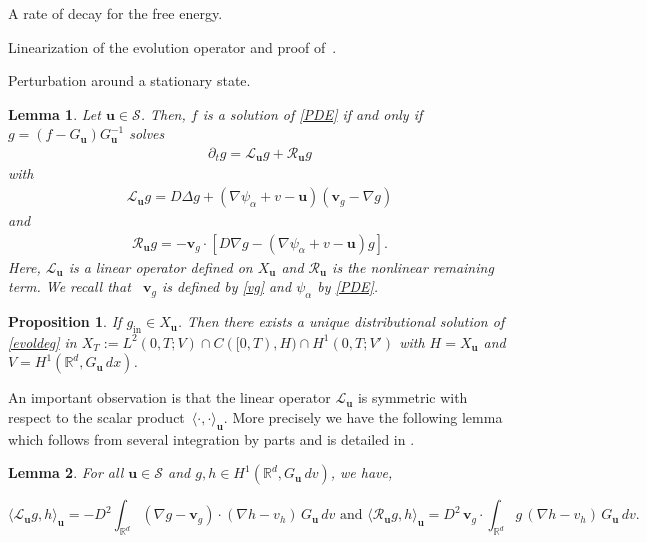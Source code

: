 \documentclass[reqno]{amsart} %
\newtheorem{proposition}{Proposition}[section]
\newtheorem{lemma}{Lemma}[section]
\begin{document}
\begin{section}{A rate of decay for the free energy.}
\begin{section}{Linearization of the evolution operator and proof of~\texorpdfstring{}{thm3}.}
\begin{subsection}{Perturbation around a stationary state.}
\begin{lemma}
   Let $\mathbf{u}\in \mathcal{S}$.  Then, $f$ is a solution of \eqref{PDE} if and only if $g=(f-G_\mathbf{u})G_\mathbf{u}^{-1}$ solves
   \begin{align}
\label{evoldeg}
    \partial_t g = \mathcal{L}_\mathbf{u}g + \mathcal{R}_\mathbf{u}g
\end{align}
with 
\begin{align}
\label{Lu}
    \mathcal{L}_\mathbf{u}g= D \Delta g +( \nabla \psi_{\alpha}+v-\mathbf{u})(\mathbf{v}_g-\nabla g)
\end{align}
and 
\begin{align}
\label{Ru}
    \mathcal{R}_\mathbf{u}g= -\mathbf{v}_g \cdot [D \nabla g-( \nabla \psi_{\alpha}+v-\mathbf{u})g].
\end{align}
Here, $\mathcal{L}_\mathbf{u}$ is a linear operator defined on $X_\mathbf{u}$ and $\mathcal{R}_\mathbf{u}$ is the nonlinear remaining term. We recall that ~$\mathbf{v}_g$ is defined by \eqref{vg} and $\psi_{\alpha}$ by \eqref{PDE}.
\end{lemma}

\begin{proposition}
\label{exuniciteL2}
    If $g_{\mathrm{in}}  \in X_\mathbf{u}$. Then there exists a unique distributional solution of \eqref{evoldeg} in $X_T:=  L^2(0,T;V) \cap  C([0,T),H)\cap H^1(0,T;V')$ with $H=X_\mathbf{u}$ and $V=H^1(\mathbb{R}^d,G_\mathbf{u}\,dx)$.
\end{proposition}


An important observation is that the linear operator $\mathcal{L}_\mathbf{u}$ is symmetric with respect to the scalar product~$\langle \cdot , \cdot \rangle_\mathbf{u}$. More precisely we have the following lemma which follows from several integration by parts and is detailed in \cite[Lemma~5.1]{Li2021}.
\begin{lemma}
\label{symmetrie}
For all $\mathbf{u} \in \mathcal{S}$ and $g,h \in H^1(\mathbb{R}^d,G_\mathbf{u}\,dv)$, we have,
 
  \[\langle\mathcal{L}_\mathbf{u}g,h\rangle_\mathbf{u}= -D^2 \int_{\mathbb{R}^d}  (\nabla g - \mathbf{v}_g)\cdot (\nabla h-v_h)\,G_{\mathbf{u}}\,dv
\text{ and } 
    \langle\mathcal{R}_\mathbf{u}g,h\rangle_\mathbf{u}= D^2\, \mathbf{v}_g \cdot\int_{\mathbb{R}^d}g\,(\nabla h- v_h)\,  G_{\mathbf{u}}\,dv.\]


\end{lemma}
\end{subsection}
\end{section}
\end{section}
\end{document}
